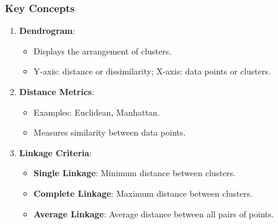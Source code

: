 \documentclass[aspectratio=169]{beamer}
\begin{document}
\begin{frame}[fragile]
    \frametitle{Key Concepts}
    \begin{enumerate}
        \item \textbf{Dendrogram}:
            \begin{itemize}
                \item Displays the arrangement of clusters.
                \item Y-axis: distance or dissimilarity; X-axis: data points or clusters.
            \end{itemize}
        \item \textbf{Distance Metrics}:
            \begin{itemize}
                \item Examples: Euclidean, Manhattan.
                \item Measures similarity between data points.
            \end{itemize}
        \item \textbf{Linkage Criteria}:
            \begin{itemize}
                \item \textbf{Single Linkage}: Minimum distance between clusters.
                \item \textbf{Complete Linkage}: Maximum distance between clusters.
                \item \textbf{Average Linkage}: Average distance between all pairs of points.
            \end{itemize}
    \end{enumerate}
\end{frame}
\end{document}
